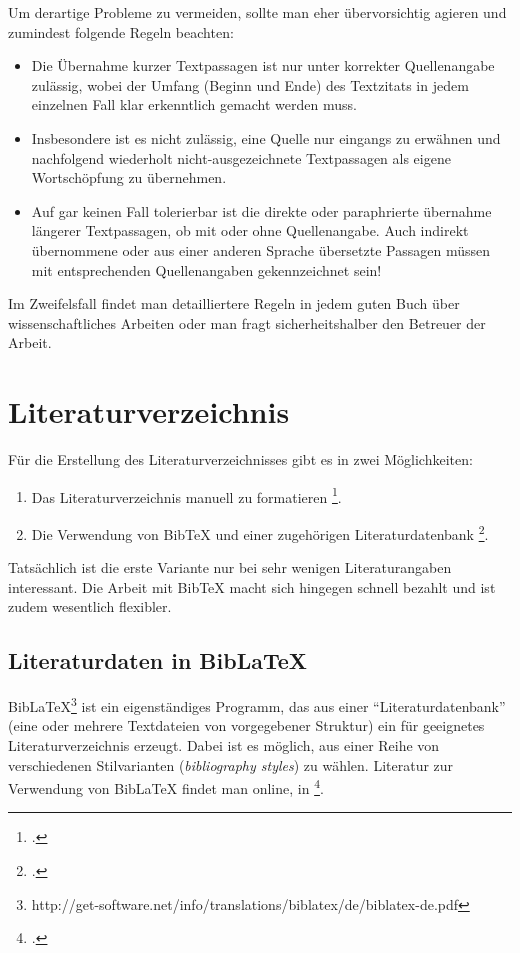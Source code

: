 Um derartige Probleme zu vermeiden, sollte man eher übervorsichtig agieren und zumindest folgende Regeln beachten:
%
\begin{itemize}
\item
Die Übernahme kurzer Textpassagen ist nur unter korrekter Quellenangabe zulässig, wobei der Umfang (Beginn und Ende) des Textzitats in jedem einzelnen Fall klar erkenntlich gemacht werden muss. 
\item
Insbesondere ist es nicht zulässig, eine Quelle nur eingangs zu erwähnen und nachfolgend wiederholt nicht-ausgezeichnete Textpassagen als eigene Wortschöpfung zu übernehmen. 
\item
Auf gar keinen Fall tolerierbar ist die direkte oder paraphrierte übernahme längerer Textpassagen, ob mit oder ohne Quellenangabe. Auch indirekt übernommene oder aus einer anderen Sprache übersetzte Passagen müssen mit entsprechenden Quellenangaben gekennzeichnet sein! 
\end{itemize}
%
Im Zweifelsfall findet man detailliertere Regeln in jedem guten Buch über wissenschaftliches Arbeiten oder man fragt sicherheitshalber den Betreuer der Arbeit.



\section{Literaturverzeichnis}

Für die Erstellung des Literaturverzeichnisses gibt es in \latex zwei
Möglichkeiten:
\begin{enumerate}
\item Das Literaturverzeichnis manuell zu formatieren \footcite[siehe][S.\ 56--57]{Kopka98}.
\item Die Verwendung von BibTeX und einer zugehörigen Literaturdatenbank
\footcite[siehe][S.\ 245--255]{Kopka98}.
\end{enumerate}
Tatsächlich ist die erste Variante nur bei sehr wenigen Literaturangaben interessant.
Die Arbeit mit BibTeX macht sich hingegen schnell bezahlt und ist zudem wesentlich
flexibler.

\subsection{Literaturdaten in BibLaTeX}
\label{sec:bibtex}

BibLaTeX\footnote{http://get-software.net/info/translations/biblatex/de/biblatex-de.pdf} ist ein eigenständiges Programm, das aus einer "`Literaturdatenbank"' (eine oder mehrere
Textdateien von vorgegebener Struktur) ein für \latex geeignetes Literaturverzeichnis
erzeugt. Dabei ist es möglich, aus einer Reihe von verschiedenen Stilvarianten
(\emph{bibliography styles}) zu wählen.
Literatur zur Verwendung von BibLaTeX findet man online, \zB in
\footcite{Taylor96,Patashnik88}.

